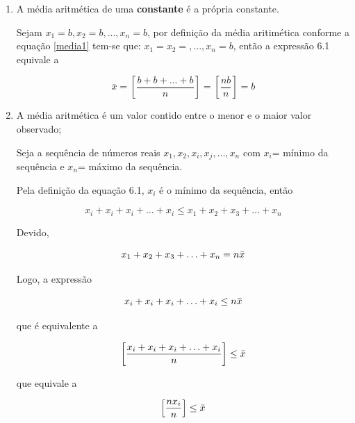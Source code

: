 \begin{enumerate}
\item [{A)}] A média aritmética de uma \textbf{constante} é a própria constante.

\vskip0.3cm
\textbf{} 

Sejam  $x_{1}=b, x_{2}=b, ..., x_{n}=b$, por definição da média aritimética conforme a equação \ref{media1} tem-se que: $x_{1}=x_{2}=,..., x_{n}=b$, então a expressão 6.1 equivale a

\begin{equation*}\label{propriedade1}
\bar{x} = \left[ \frac{b+b+...+b}{n} \right ] = \left [\frac{nb}{n} \right ]= b
\end{equation*}
 

\item [{B)}] A média aritmética é um valor contido entre o menor e o maior valor observado; 

\vskip0.3cm
\textbf{} 

Seja a sequência de números reais $x_{1},x_{2},x_{i},x_{j},\ldots,x_{n}$ com $x_{i}$= mínimo da sequência e $x_{n}$= máximo da sequência. \vskip0.3cm

Pela definição da equação 6.1, $x_{i}$ é o mínimo da sequência, então 

\begin{equation*}\label{propriedade1}
x_{i}+x_{i}+x_{i}+\ldots+x_{i} \leq  x_{1}+x_{2}+x_{3}+\ldots+x_{n}
\end{equation*}

Devido,

\begin{equation*}\label{propriedade1}
x_{1}+x_{2}+x_{3}+\ldots+x_{n}=n \Bar{x}
\end{equation*}

Logo, a expressão

\begin{equation*}\label{propriedade1}
x_{i}+x_{i}+x_{i}+\ldots+x_{i} \leq n \Bar{x}
\end{equation*}

que é equivalente a 

\begin{equation*}\label{propriedade1}
\left[ \frac{x_{i}+x_{i}+x_{i}+\ldots+x_{i}}{n}  \right ] \leq \Bar{x}
\end{equation*}

que equivale a 

\begin{equation*}\label{propriedade1}
\left[ \frac{nx_{i}}{n} \right ]  \leq \Bar{x}
\end{equation*}


\end{enumerate}
